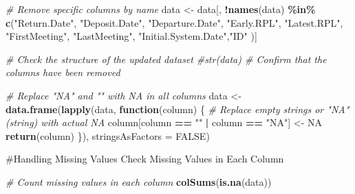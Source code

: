 \documentclass[
]{article}
\newenvironment{Shaded}{\begin{snugshade}}{\end{snugshade}}
\newcommand{\AttributeTok}[1]{\textcolor[rgb]{0.13,0.29,0.53}{#1}}
\newcommand{\CommentTok}[1]{\textcolor[rgb]{0.56,0.35,0.01}{\textit{#1}}}
\newcommand{\ConstantTok}[1]{\textcolor[rgb]{0.56,0.35,0.01}{#1}}
\newcommand{\ControlFlowTok}[1]{\textcolor[rgb]{0.13,0.29,0.53}{\textbf{#1}}}
\newcommand{\FunctionTok}[1]{\textcolor[rgb]{0.13,0.29,0.53}{\textbf{#1}}}
\newcommand{\NormalTok}[1]{#1}
\newcommand{\OtherTok}[1]{\textcolor[rgb]{0.56,0.35,0.01}{#1}}
\newcommand{\SpecialCharTok}[1]{\textcolor[rgb]{0.81,0.36,0.00}{\textbf{#1}}}
\newcommand{\StringTok}[1]{\textcolor[rgb]{0.31,0.60,0.02}{#1}}
\begin{document}
\begin{Shaded}
\begin{Highlighting}[]
\CommentTok{\# Remove specific columns by name}
\NormalTok{data }\OtherTok{\textless{}{-}}\NormalTok{ data[, }\SpecialCharTok{!}\FunctionTok{names}\NormalTok{(data) }\SpecialCharTok{\%in\%} \FunctionTok{c}\NormalTok{(}\StringTok{"Return.Date"}\NormalTok{, }\StringTok{"Deposit.Date"}\NormalTok{, }\StringTok{"Departure.Date"}\NormalTok{, }\StringTok{"Early.RPL"}\NormalTok{, }\StringTok{"Latest.RPL"}\NormalTok{, }\StringTok{"FirstMeeting"}\NormalTok{, }\StringTok{"LastMeeting"}\NormalTok{, }\StringTok{"Initial.System.Date"}\NormalTok{,}\StringTok{"ID"}\NormalTok{ )]}

\CommentTok{\# Check the structure of the updated dataset}
\CommentTok{\#str(data)  \# Confirm that the columns have been removed}


\CommentTok{\# Replace "NA" and "" with NA in all columns}
\NormalTok{data }\OtherTok{\textless{}{-}} \FunctionTok{data.frame}\NormalTok{(}\FunctionTok{lapply}\NormalTok{(data, }\ControlFlowTok{function}\NormalTok{(column) \{}
  \CommentTok{\# Replace empty strings or "NA" (string) with actual NA}
\NormalTok{  column[column }\SpecialCharTok{==} \StringTok{""} \SpecialCharTok{|}\NormalTok{ column }\SpecialCharTok{==} \StringTok{"NA"}\NormalTok{] }\OtherTok{\textless{}{-}} \ConstantTok{NA}
  \FunctionTok{return}\NormalTok{(column)}
\NormalTok{\}), }\AttributeTok{stringsAsFactors =} \ConstantTok{FALSE}\NormalTok{)}
\end{Highlighting}
\end{Shaded}

\#Handling Missing Values Check Missing Values in Each Column

\begin{Shaded}
\begin{Highlighting}[]
\CommentTok{\# Count missing values in each column}
\FunctionTok{colSums}\NormalTok{(}\FunctionTok{is.na}\NormalTok{(data))}
\end{Highlighting}
\end{Shaded}
\end{document}
